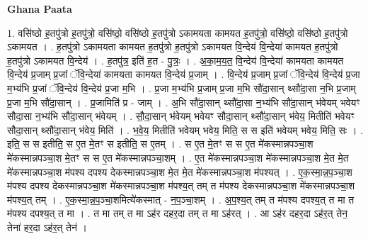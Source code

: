 \documentclass[17pt]{extarticle}
\begin{document}
\textbf{Ghana Paata } \newline

1. वसि॑ष्ठो ह॒तपु॑त्रो ह॒तपु॑त्रो॒ वसि॑ष्ठो॒ वसि॑ष्ठो ह॒तपु॑त्रो ऽकामयता कामयत ह॒तपु॑त्रो॒ वसि॑ष्ठो॒ वसि॑ष्ठो ह॒तपु॑त्रो ऽकामयत । . ह॒तपु॑त्रो ऽकामयता कामयत ह॒तपु॑त्रो ह॒तपु॑त्रो ऽकामयत वि॒न्देय॑ वि॒न्देया॑ कामयत ह॒तपु॑त्रो ह॒तपु॑त्रो ऽकामयत वि॒न्देय॑ । . ह॒तपु॑त्र॒ इति॑ ह॒त - पु॒त्रः॒ । . अ॒का॒म॒य॒त॒ वि॒न्देय॑ वि॒न्देया॑ कामयता कामयत वि॒न्देय॑ प्र॒जाम् प्र॒जां ॅवि॒न्देया॑ कामयता कामयत वि॒न्देय॑ प्र॒जाम् । . वि॒न्देय॑ प्र॒जाम् प्र॒जां ॅवि॒न्देय॑ वि॒न्देय॑ प्र॒जा म॒भ्य॑भि प्र॒जां ॅवि॒न्देय॑ वि॒न्देय॑ प्र॒जा म॒भि । . प्र॒जा म॒भ्य॑भि प्र॒जाम् प्र॒जा म॒भि सौ॑दा॒सान् थ्सौ॑दा॒सा न॒भि प्र॒जाम् प्र॒जा म॒भि सौ॑दा॒सान् । . प्र॒जामिति॑ प्र - जाम् । . अ॒भि सौ॑दा॒सान् थ्सौ॑दा॒सा न॒भ्य॑भि सौ॑दा॒सान् भ॑वेयम् भवेयꣳ सौदा॒सा न॒भ्य॑भि सौ॑दा॒सान् भ॑वेयम् । . सौ॒दा॒सान् भ॑वेयम् भवेयꣳ सौदा॒सान् थ्सौ॑दा॒सान् भ॑वेय॒ मितीति॑ भवेयꣳ सौदा॒सान् थ्सौ॑दा॒सान् भ॑वेय॒ मिति॑ । . भ॒वे॒य॒ मितीति॑ भवेयम् भवेय॒ मिति॒ स स इति॑ भवेयम् भवेय॒ मिति॒ सः । . इति॒ स स इतीति॒ स ए॒त मे॒तꣳ स इतीति॒ स ए॒तम् । . स ए॒त मे॒तꣳ स स ए॒त मे॑कस्मान्नपञ्चा॒श मे॑कस्मान्नपञ्चा॒श मे॒तꣳ स स ए॒त मे॑कस्मान्नपञ्चा॒शम् । . ए॒त मे॑कस्मान्नपञ्चा॒श मे॑कस्मान्नपञ्चा॒श मे॒त मे॒त मे॑कस्मान्नपञ्चा॒श म॑पश्य दपश्य देकस्मान्नपञ्चा॒श मे॒त मे॒त मे॑कस्मान्नपञ्चा॒श म॑पश्यत् । . ए॒क॒स्मा॒न्न॒प॒ञ्चा॒श म॑पश्य दपश्य देकस्मान्नपञ्चा॒श मे॑कस्मान्नपञ्चा॒श म॑पश्य॒त् तम् त म॑पश्य देकस्मान्नपञ्चा॒श मे॑कस्मान्नपञ्चा॒श म॑पश्य॒त् तम् । . ए॒क॒स्मा॒न्न॒प॒ञ्चा॒शमित्ये॑कस्मात् - न॒प॒ञ्चा॒शम् । . अ॒प॒श्य॒त् तम् त म॑पश्य दपश्य॒त् त मा त म॑पश्य दपश्य॒त् त मा । . त मा तम् त मा ऽह॑र दहर॒दा तम् त मा ऽह॑रत् । . आ ऽह॑र दहर॒दा ऽह॑र॒त् तेन॒ तेना॑ हर॒दा ऽह॑र॒त् तेन॑ । \newline
\end{document}
